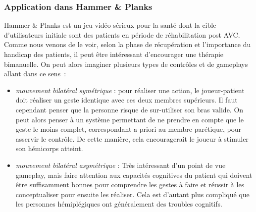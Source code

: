 		\subsubsection*{Application dans Hammer \& Planks}
Hammer \& Planks est un jeu vidéo sérieux pour la santé dont la cible d'utilisateurs initiale sont des patients en période de réhabilitation post AVC. Comme nous venons de le voir, selon la phase de récupération et l'importance du handicap des patients, il peut être intéressant d'encourager une thérapie bimanuelle. On peut alors imaginer plusieurs types de contrôles et de gameplays allant dans ce sens~:
\begin{itemize}
	\item \emph{mouvement bilatéral symétrique} : pour réaliser une action, le joueur-patient doit réaliser un geste identique avec ces deux membres supérieurs. Il faut cependant penser que la personne risque de sur-utiliser son bras valide. On peut alors penser à un système permettant de ne prendre en compte que le geste le moins complet, correspondant a priori au membre parétique, pour asservir le contrôle. De cette manière, cela encouragerait le joueur à stimuler son hémicorps atteint.
	\item \emph{mouvement bilatéral asymétrique} : Très intéressant d'un point de vue gameplay, mais faire attention aux capacités cognitives du patient qui doivent être suffisamment bonnes pour comprendre les gestes à faire et réussir à les conceptualiser pour ensuite les réaliser. Cela est d'autant plus compliqué que les personnes hémiplégiques ont généralement des troubles cognitifs.
\end{itemize}